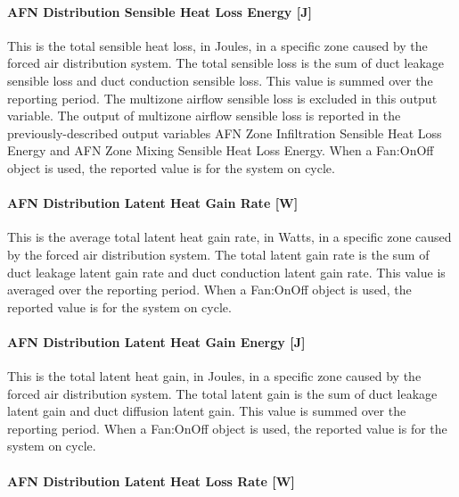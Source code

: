 \paragraph{AFN Distribution Sensible Heat Loss Energy {[}J{]}}\label{afn-distribution-sensible-heat-loss-energy-j}

This is the total sensible heat loss, in Joules, in a specific zone caused by the forced air distribution system. The total sensible loss is the sum of duct leakage sensible loss and duct conduction sensible loss. This value is summed over the reporting period. The multizone airflow sensible loss is excluded in this output variable. The output of multizone airflow sensible loss is reported in the previously-described output variables AFN Zone Infiltration Sensible Heat Loss Energy and AFN Zone Mixing Sensible Heat Loss Energy. When a Fan:OnOff object is used, the reported value is for the system on cycle.

\paragraph{AFN Distribution Latent Heat Gain Rate {[}W{]}}\label{afn-distribution-latent-heat-gain-rate-w}

This is the average total latent heat gain rate, in Watts, in a specific zone caused by the forced air distribution system. The total latent gain rate is the sum of duct leakage latent gain rate and duct conduction latent gain rate. This value is averaged over the reporting period. When a Fan:OnOff object is used, the reported value is for the system on cycle.

\paragraph{AFN Distribution Latent Heat Gain Energy {[}J{]}}\label{afn-distribution-latent-heat-gain-energy-j}

This is the total latent heat gain, in Joules, in a specific zone caused by the forced air distribution system. The total latent gain is the sum of duct leakage latent gain and duct diffusion latent gain. This value is summed over the reporting period. When a Fan:OnOff object is used, the reported value is for the system on cycle.

\paragraph{AFN Distribution Latent Heat Loss Rate {[}W{]}}\label{afn-distribution-latent-heat-loss-rate-w}

